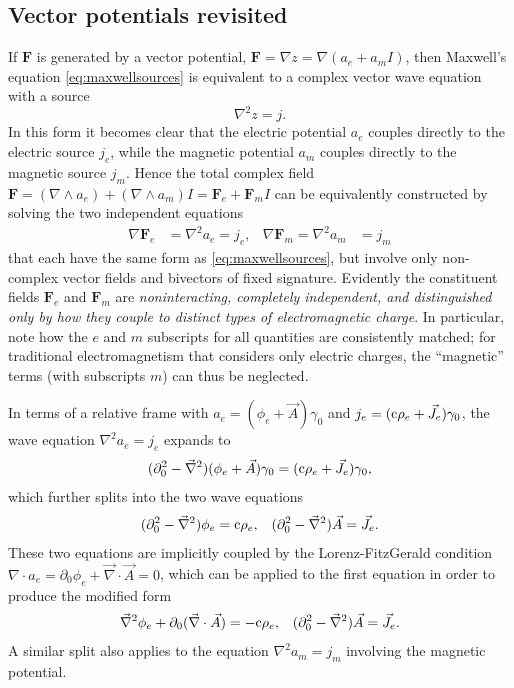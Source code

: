 \documentclass[1p,sort&compress]{elsarticle}
\numberwithin{equation}{section}
\newcommand{\rv}[1]{\vec{#1}}
\newcommand{\bv}[1]{\mathbf{#1}}
\newcommand{\cc}{{\rm c}}
\begin{document}

\subsection{Vector potentials revisited}


If $\bv{F}$ is generated by a vector potential, $\bv{F} = \nabla z = \nabla(a_e + a_m I)$, then Maxwell's equation \eqref{eq:maxwellsources} is equivalent to a complex vector wave equation with a source
\begin{equation}
  \nabla^2 z = j.
\end{equation}
In this form it becomes clear that the electric potential $a_e$ couples directly to the electric source $j_e$, while the magnetic potential $a_m$ couples directly to the magnetic source $j_m$.  Hence the total complex field $\bv{F} = (\nabla\wedge a_e) + (\nabla\wedge a_m)I = \bv{F}_e + \bv{F}_m I$ can be equivalently constructed by solving the two independent equations
\begin{align}
  \nabla \bv{F}_e &= \nabla^2 a_e = j_e, & \nabla \bv{F}_m = \nabla^2 a_m &= j_m
\end{align}
that each have the same form as \eqref{eq:maxwellsources}, but involve only non-complex vector fields and bivectors of fixed signature.  Evidently the constituent fields $\bv{F}_e$ and $\bv{F}_m$ are \emph{noninteracting, completely independent, and distinguished only by how they couple to distinct types of electromagnetic charge}.  In particular, note how the $e$ and $m$ subscripts for all quantities are consistently matched; for traditional electromagnetism that considers only electric charges, the ``magnetic'' terms (with subscripts $m$) can thus be neglected.

In terms of a relative frame with $a_e = (\phi_e + \rv{A})\gamma_0$ and $j_e = (\cc\rho_e + \rv{J}_e)\gamma_0$, the wave equation $\nabla^2 a_e = j_e$ expands to
\begin{align}\label{eq:potentialwavesraw}
  (\partial_0^2 - \rv{\nabla}^2)(\phi_e + \rv{A})\gamma_0 = (\cc\rho_e + \rv{J}_e)\gamma_0,
\end{align}
which further splits into the two wave equations \cite{Jackson1999}
\begin{align}\label{eq:potentialwavesdecoupled}
  (\partial_0^2 - \rv{\nabla}^2) \phi_e &= \cc\rho_e, & (\partial_0^2 - \rv{\nabla}^2)\rv{A} = \rv{J}_e. 
\end{align}
These two equations are implicitly coupled by the Lorenz-FitzGerald condition $\nabla\cdot a_e = \partial_0 \phi_e + \rv{\nabla}\cdot\rv{A} = 0$, which can be applied to the first equation in order to produce the modified form 
\begin{align}\label{eq:potentialwaves}
  \rv{\nabla}^2 \phi_e + \partial_0(\rv{\nabla}\cdot\rv{A}) &= -\cc\rho_e, & (\partial_0^2 - \rv{\nabla}^2)\rv{A} = \rv{J}_e. 
\end{align}
A similar split also applies to the equation $\nabla^2 a_m = j_m$ involving the magnetic potential.
\end{document}
